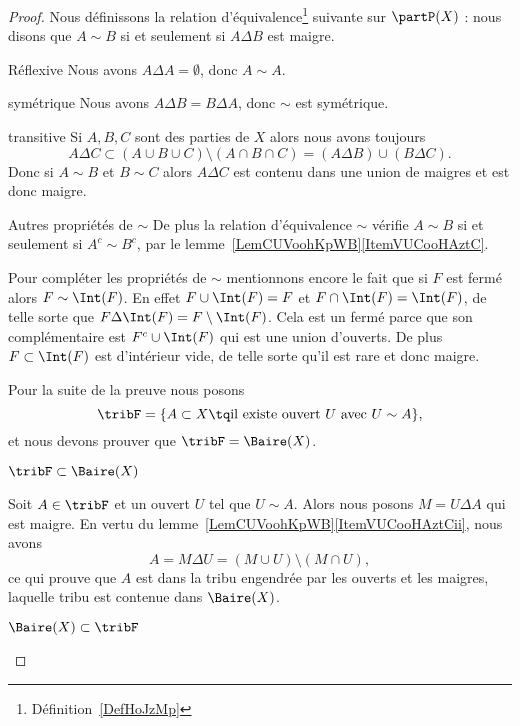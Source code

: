 \begin{proof}
    Nous définissons la relation d'équivalence\footnote{Définition~\ref{DefHoJzMp}} suivante sur \( \partP(X)\) : nous disons que \( A\sim B\) si et seulement si \( A\Delta B\) est maigre.
    \begin{subproof}
    \item[Réflexive]
        Nous avons \( A\Delta A=\emptyset\), donc \( A\sim A\).
    \item[symétrique] Nous avons \( A\Delta B=B\Delta A\), donc \( \sim\) est symétrique.
    \item[transitive] Si \( A,B,C\) sont des parties de \( X\) alors nous avons toujours
        \begin{equation}
            A\Delta C\subset (A\cup B\cup C)\setminus(A\cap B\cap C)=(A\Delta B)\cup (B\Delta C).
        \end{equation}
        Donc si \( A\sim B\) et \( B\sim C\) alors \( A\Delta C\) est contenu dans une union de maigres et est donc maigre.
    \item[Autres propriétés de \( \sim\)]
        De plus la relation d'équivalence \( \sim\) vérifie \( A\sim B\) si et seulement si \( A^c\sim B^c\), par le lemme~\ref{LemCUVoohKpWB}\ref{ItemVUCooHAztC}.

        Pour compléter les propriétés de \( \sim\) mentionnons encore le fait que si \( F\) est fermé alors \( F\sim\Int(F)\). En effet \( F\cup\Int(F)=F\) et \( F\cap\Int(F)=\Int(F)\), de telle sorte que \( F\Delta\Int(F)=F\setminus\Int(F)\). Cela est un fermé parce que son complémentaire est \( F^c\cup\Int(F)\) qui est une union d'ouverts. De plus \( F\subset\Int(F)\) est d'intérieur vide, de telle sorte qu'il est rare et donc maigre.
    \end{subproof}

    Pour la suite de la preuve nous posons
    \begin{equation}
        \tribF=\{ A\subset X\tq\text{il existe ouvert } U\text{ avec } U\sim A \},
    \end{equation}
    et nous devons prouver que \( \tribF=\Baire(X)\).

    \begin{subproof}
        \item[\( \tribF\subset\Baire(X)\)]

            Soit \( A\in\tribF\) et un ouvert \( U\) tel que \( U\sim A\). Alors nous posons \( M=U\Delta A\) qui est maigre. En vertu du lemme~\ref{LemCUVoohKpWB}\ref{ItemVUCooHAztCii}, nous avons
            \begin{equation}
                A=M\Delta U=(M\cup U)\setminus(M\cap U),
            \end{equation}
            ce qui prouve que \( A\) est dans la tribu engendrée par les ouverts et les maigres, laquelle tribu est contenue dans \( \Baire(X)\).
        \item[\( \Baire(X)\subset\tribF\)]


\end{subproof}
\end{proof}

